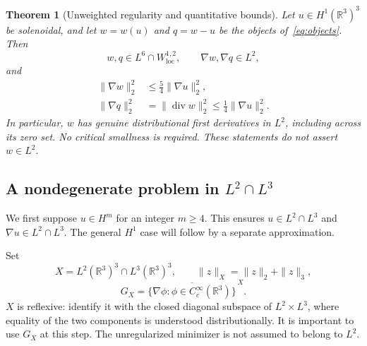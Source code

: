 \documentclass[11pt,a4paper]{article}
\newtheorem{theorem}{Theorem}[section]
\theoremstyle{definition}
\newcommand{\R}{\mathbb R}
\DeclareMathOperator{\diver}{div}
\begin{document}
\begin{theorem}[Unweighted regularity and quantitative bounds]\label{thm:main}
Let $u\in H^1(\R^3)^3$ be solenoidal, and let $w=w(u)$ and $q=w-u$ be the objects of~\eqref{eq:objects}. Then
\begin{equation}\label{eq:mainspaces}
 w,q\in L^6\cap W^{1,2}_{\mathrm{loc}},\qquad
 \nabla w,\nabla q\in L^2,
\end{equation}
and
\begin{align}
 \|\nabla w\|_2^2&\le\frac54\|\nabla u\|_2^2,\label{eq:mainw}\\
 \|\nabla q\|_2^2&=\|\diver w\|_2^2
 \le\frac14\|\nabla u\|_2^2.\label{eq:mainq}
\end{align}
In particular, $w$ has genuine distributional first derivatives in $L^2$, including across its zero set. No critical smallness is required. These statements do not assert $w\in L^2$.
\end{theorem}

\subsection{A nondegenerate problem in \texorpdfstring{$L^2\cap L^3$}{L2 intersection L3}}
We first suppose $u\in H^m$ for an integer $m\ge4$. This ensures $u\in L^2\cap L^3$ and $\nabla u\in L^2\cap L^3$. The general $H^1$ case will follow by a separate approximation.

Set
\[
 X=L^2(\R^3)^3\cap L^3(\R^3)^3,
 \qquad \|z\|_X=\|z\|_2+\|z\|_3,
\]
\[
 G_X=\overline{\{\nabla\phi:\phi\in C_c^\infty(\R^3)\}}^{\,X}.
\]
$X$ is reflexive: identify it with the closed diagonal subspace of $L^2\times L^3$, where equality of the two components is understood distributionally. It is important to use $G_X$ at this step. The unregularized minimizer is not assumed to belong to $L^2$.
\end{document}
